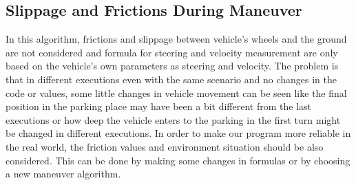 \subsection{Slippage and Frictions During Maneuver}
In this algorithm, frictions and slippage between vehicle's wheels and the ground are not considered and formula for steering and velocity measurement are only based on the vehicle's own parameters as steering and velocity. The problem is that in different executions even with the same scenario and no changes in the code or values, some little changes in vehicle movement can be seen like the final position in the parking place may have been a bit different from the last executions or how deep the vehicle enters to the parking in the first turn might be changed in different executions. In order to make our program more reliable in the real world, the friction values and environment situation should be also considered. This can be done by making some changes in formulas or by choosing a new maneuver algorithm.



